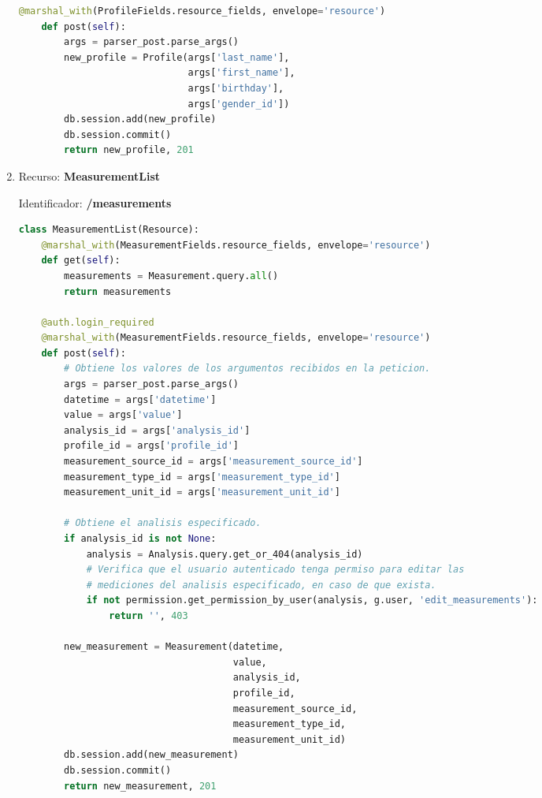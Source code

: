 \begin{enumerate}
\begin{lstlisting}[language=Python]
    @marshal_with(ProfileFields.resource_fields, envelope='resource')
    def post(self):
        args = parser_post.parse_args()
        new_profile = Profile(args['last_name'],
                              args['first_name'],
                              args['birthday'],
                              args['gender_id'])
        db.session.add(new_profile)
        db.session.commit()
        return new_profile, 201
\end{lstlisting}

\item Recurso: \textbf{MeasurementList}

Identificador: \textbf{/measurements}

\begin{lstlisting}[language=Python]
class MeasurementList(Resource):
    @marshal_with(MeasurementFields.resource_fields, envelope='resource')
    def get(self):
        measurements = Measurement.query.all()
        return measurements

    @auth.login_required
    @marshal_with(MeasurementFields.resource_fields, envelope='resource')
    def post(self):
        # Obtiene los valores de los argumentos recibidos en la peticion.
        args = parser_post.parse_args()
        datetime = args['datetime']
        value = args['value']
        analysis_id = args['analysis_id']
        profile_id = args['profile_id']
        measurement_source_id = args['measurement_source_id']
        measurement_type_id = args['measurement_type_id']
        measurement_unit_id = args['measurement_unit_id']

        # Obtiene el analisis especificado.
        if analysis_id is not None:
            analysis = Analysis.query.get_or_404(analysis_id)
            # Verifica que el usuario autenticado tenga permiso para editar las
            # mediciones del analisis especificado, en caso de que exista.
            if not permission.get_permission_by_user(analysis, g.user, 'edit_measurements'):
                return '', 403

        new_measurement = Measurement(datetime,
                                      value,
                                      analysis_id,
                                      profile_id,
                                      measurement_source_id,
                                      measurement_type_id,
                                      measurement_unit_id)
        db.session.add(new_measurement)
        db.session.commit()
        return new_measurement, 201
\end{lstlisting}


\end{enumerate}
